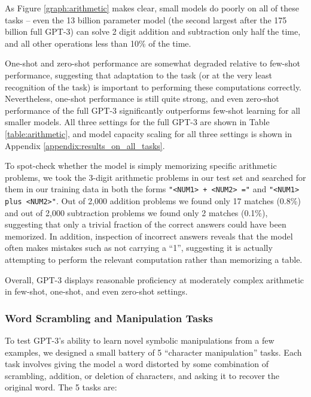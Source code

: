 As Figure \ref{graph:arithmetic} makes clear, small models do poorly on all of these tasks -- even the 13 billion parameter model (the second largest after the 175 billion full GPT-3) can solve 2 digit addition and subtraction only half the time, and all other operations less than 10\% of the time.

One-shot and zero-shot performance are somewhat degraded relative to few-shot performance, suggesting that adaptation to the task (or at the very least recognition of the task) is important to performing these computations correctly.  Nevertheless, one-shot performance is still quite strong, and even zero-shot performance of the full GPT-3 significantly outperforms few-shot learning for all smaller models.  All three settings for the full GPT-3 are shown in Table \ref{table:arithmetic}, and model capacity scaling for all three settings is shown in Appendix \ref{appendix:results_on_all_tasks}.

To spot-check whether the model is simply memorizing specific arithmetic problems, we took the 3-digit arithmetic problems in our test set and searched for them in our training data in both the forms \texttt{"<NUM1> + <NUM2> ="} and \texttt{"<NUM1> plus <NUM2>"}.  Out of 2,000 addition problems we found only 17 matches (0.8\%) and out of 2,000 subtraction problems we found only 2 matches (0.1\%), suggesting that only a trivial fraction of the correct answers could have been memorized.  In addition, inspection of incorrect answers reveals that the model often makes mistakes such as not carrying a ``1'', suggesting it is actually attempting to perform the relevant computation rather than memorizing a table.

Overall, GPT-3 displays reasonable proficiency at moderately complex arithmetic in few-shot, one-shot, and even zero-shot settings.

        \subsubsection{Word Scrambling and Manipulation Tasks}
        \label{section:Word_Scrambling_and_Manipulation_Tasks}

To test GPT-3's ability to learn novel symbolic manipulations from a few examples, we designed a small battery of 5 ``character manipulation'' tasks.  Each task involves giving the model a word distorted by some combination of scrambling, addition, or deletion of characters, and asking it to recover the original word.  The 5 tasks are:

